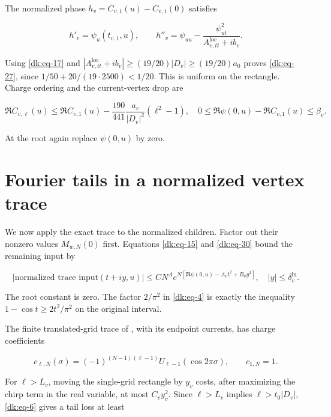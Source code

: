 The normalized phase \(h_v=C_{v,1}(u)-C_{v,1}(0)\) satisfies

\begin{equation}\label{dk:eq-36}
h'_v=\psi_u(t_{v,1},u),\qquad
 h''_v=\psi_{uu}
       -\frac{\psi_{ut}^2}{A_{v,tt}^{\mathrm{loc}}+ib_v}.
\end{equation}

Using \eqref{dk:eq-17} and \(|A_{v,tt}^{\mathrm{loc}}+ib_v|\ge(19/20)|D_v|\ge(19/20)a_0\) proves \eqref{dk:eq-27},
since \(1/50+20/(19\cdot2500)<1/20\). This is uniform on the rectangle.
Charge ordering and the current-vertex drop are

\begin{equation}\label{dk:eq-37}
\Re C_{v,\ell}(u)\le\Re C_{v,1}(u)
  -\frac{190}{441}\frac{a_v}{|D_v|^2}(\ell^2-1),
 \quad
 0\le\Re\psi(0,u)-\Re C_{v,1}(u)\le\beta_v.
\end{equation}

At the root again replace \(\psi(0,u)\) by zero.

\section{Fourier tails in a normalized vertex trace}\label{dk:sec-5}

We now apply the exact trace to the normalized children. Factor out
their nonzero values \(M_{w,N}(0)\) first. Equations
\eqref{dk:eq-15} and \eqref{dk:eq-30} bound the remaining input by

\begin{equation}\label{dk:eq-38}
|\text{normalized trace input}(t+iy,u)|
 \le CN^A
   e^{N[\Re\psi(0,u)-A_vt^2+B_vy^2]},
                      \quad |y|\le\delta_v^{\mathrm{in}}.
\end{equation}

The root constant is zero. The factor \(2/\pi^2\) in \eqref{dk:eq-4} is exactly the
inequality \(1-\cos t\ge2t^2/\pi^2\) on the original interval.

The finite translated-grid trace of
\cite[Section~6.1]{MovingMeridianSources}, with its endpoint currents,
has charge coefficients

\begin{equation}\label{dk:eq-39}
c_{\ell,N}(\sigma)=(-1)^{(N-1)(\ell-1)}
               U_{\ell-1}(\cos2\pi\sigma),\qquad c_{1,N}=1.
\end{equation}

For \(\ell>L_v\), moving the single-grid rectangle by \(y_v\) costs, after
maximizing the chirp term in the real variable, at most \(C_v y_v^2\).
Since \(\ell>L_v\) implies \(\ell>t_0|D_v|\), \eqref{dk:eq-6} gives a tail loss at least

